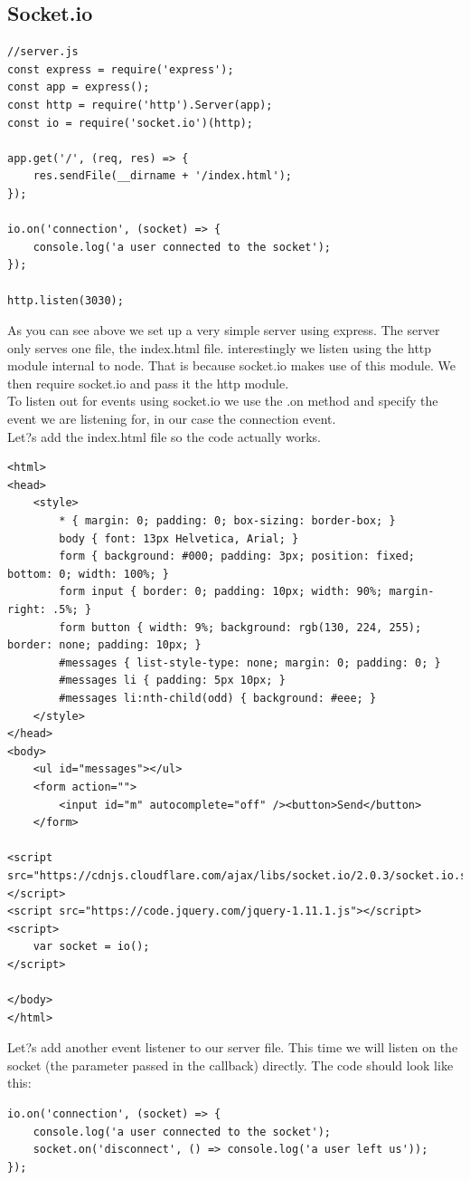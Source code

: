 \documentclass[a4paper]{article}
\begin{document}
\subsection{Socket.io}
\begin{lstlisting}
//server.js
const express = require('express');
const app = express();
const http = require('http').Server(app);
const io = require('socket.io')(http);

app.get('/', (req, res) => {
    res.sendFile(__dirname + '/index.html');
});

io.on('connection', (socket) => {
    console.log('a user connected to the socket');
});

http.listen(3030);
\end{lstlisting}
As you can see above we set up a very simple server using express. The server only serves one file, the index.html file. interestingly we listen using the http module internal to node. That is because socket.io makes use of this module. We then require socket.io and pass it the http module.\\

To listen out for events using socket.io we use the .on method and specify the event we are listening for, in our case the connection event.\\

Let?s add the index.html file so the code actually works.
\begin{lstlisting}
<html>
<head>
    <style>
        * { margin: 0; padding: 0; box-sizing: border-box; }
        body { font: 13px Helvetica, Arial; }
        form { background: #000; padding: 3px; position: fixed; bottom: 0; width: 100%; }
        form input { border: 0; padding: 10px; width: 90%; margin-right: .5%; }
        form button { width: 9%; background: rgb(130, 224, 255); border: none; padding: 10px; }
        #messages { list-style-type: none; margin: 0; padding: 0; }
        #messages li { padding: 5px 10px; }
        #messages li:nth-child(odd) { background: #eee; }
    </style>
</head>
<body>
    <ul id="messages"></ul>
    <form action="">
        <input id="m" autocomplete="off" /><button>Send</button>
    </form>

<script src="https://cdnjs.cloudflare.com/ajax/libs/socket.io/2.0.3/socket.io.slim.js"></script>
<script src="https://code.jquery.com/jquery-1.11.1.js"></script>
<script>
    var socket = io();
</script>

</body>
</html>
\end{lstlisting}
Let?s add another event listener to our server file. This time we will listen on the socket (the parameter passed in the callback) directly. The code should look like this:
\begin{lstlisting}
io.on('connection', (socket) => {
    console.log('a user connected to the socket');
    socket.on('disconnect', () => console.log('a user left us'));
});
\end{lstlisting}
\end{document}
